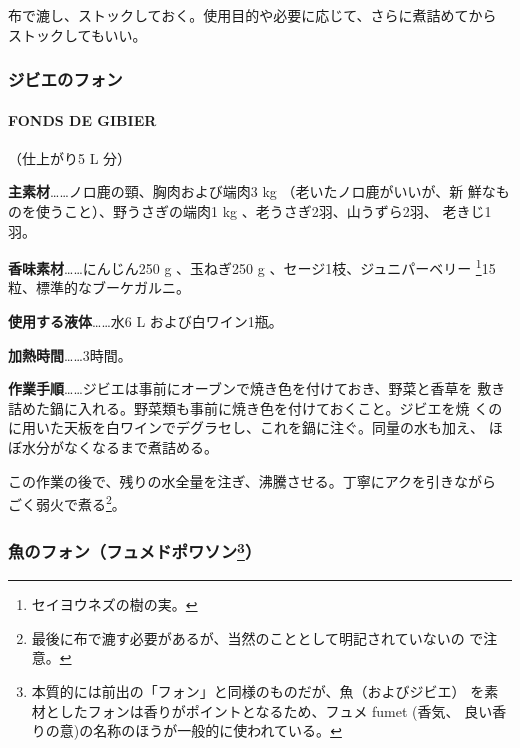 \documentclass[twoside,12Q,b5j]{escoffierltjsbook}
\newenvironment{recette}{\begin{multicols}{2}}{\end{multicols}}
\begin{document}
\begin{recette}
布で漉し、ストックしておく。使用目的や必要に応じて、さらに煮詰めてから
ストックしてもいい。

\vspace*{2\zw}

\subsubsection{ジビエのフォン}\label{ux30b8ux30d3ux30a8ux306eux30d5ux30a9ux30f3}

\paragraph{FONDS DE GIBIER}\label{fonds-de-gibier}


（仕上がり5 L 分）

\textbf{主素材}\ldots{}\ldots{}ノロ鹿の頸、胸肉および端肉3 kg
（老いたノロ鹿がいいが、新 鮮なものを使うこと）、野うさぎの端肉1 kg
、老うさぎ2羽、山うずら2羽、 老きじ1羽。

\textbf{香味素材}\ldots{}\ldots{}にんじん250 g 、玉ねぎ250 g
、セージ1枝、ジュニパーベリー \footnote{セイヨウネズの樹の実。}15粒、標準的なブーケガルニ。

\textbf{使用する液体}\ldots{}\ldots{}水6 L および白ワイン1瓶。

\textbf{加熱時間}\ldots{}\ldots{}3時間。

\textbf{作業手順}\ldots{}\ldots{}ジビエは事前にオーブンで焼き色を付けておき、野菜と香草を
敷き詰めた鍋に入れる。野菜類も事前に焼き色を付けておくこと。ジビエを焼
くのに用いた天板を白ワインでデグラセし、これを鍋に注ぐ。同量の水も加え、
ほぼ水分がなくなるまで煮詰める。

この作業の後で、残りの水全量を注ぎ、沸騰させる。丁寧にアクを引きながら
ごく弱火で煮る\footnote{最後に布で漉す必要があるが、当然のこととして明記されていないの
  で注意。}。

\vspace*{2\zw}

\subsubsection[魚のフォン（フュメドポワソン）]{\texorpdfstring{魚のフォン（フュメドポワソン\footnote{本質的には前出の「フォン」と同様のものだが、魚（およびジビエ）
  を素材としたフォンは香りがポイントとなるため、フュメ fumet (香気、
  良い香りの意)の名称のほうが一般的に使われている。}）}{魚のフォン（フュメドポワソン）}}\label{ux9b5aux306eux30d5ux30a9ux30f3ux30d5ux30e5ux30e1ux30c9ux30ddux30efux30bdux30f31010013}


\end{recette}
\end{document}
